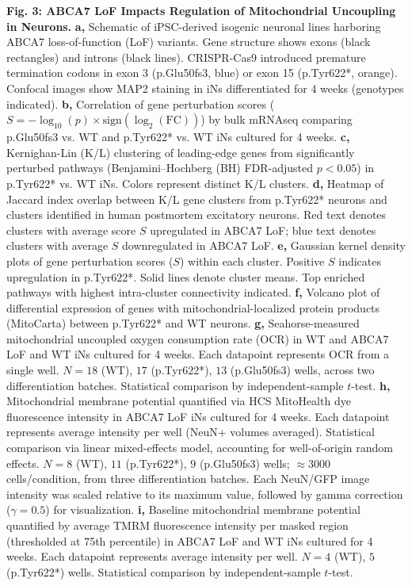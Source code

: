 \textbf{Fig. 3: ABCA7 LoF Impacts Regulation of Mitochondrial Uncoupling in Neurons.}\newline
\textbf{a,} Schematic of iPSC-derived isogenic neuronal lines harboring ABCA7 loss-of-function (LoF) variants. Gene structure shows exons (black rectangles) and introns (black lines). CRISPR-Cas9 introduced premature termination codons in exon 3 (p.Glu50fs3, blue) or exon 15 (p.Tyr622*, orange). Confocal images show MAP2 staining in iNs differentiated for 4 weeks (genotypes indicated).
\textbf{b,} Correlation of gene perturbation scores ($S = -\log_{10}(p)\times\text{sign}(\log_2(\text{FC}))$) by bulk mRNAseq comparing p.Glu50fs3 vs. WT and p.Tyr622* vs. WT iNs cultured for 4 weeks.
\textbf{c,} Kernighan-Lin (K/L) clustering of leading-edge genes from significantly perturbed pathways (Benjamini–Hochberg (BH) FDR-adjusted $p<0.05$) in p.Tyr622* vs. WT iNs. Colors represent distinct K/L clusters.
\textbf{d,} Heatmap of Jaccard index overlap between K/L gene clusters from p.Tyr622* neurons and clusters identified in human postmortem excitatory neurons. Red text denotes clusters with average score $S$ upregulated in ABCA7 LoF; blue text denotes clusters with average $S$ downregulated in ABCA7 LoF.
\textbf{e,} Gaussian kernel density plots of gene perturbation scores ($S$) within each cluster. Positive $S$ indicates upregulation in p.Tyr622*. Solid lines denote cluster means. Top enriched pathways with highest intra-cluster connectivity indicated.
\textbf{f,} Volcano plot of differential expression of genes with mitochondrial-localized protein products (MitoCarta) between p.Tyr622* and WT neurons.
\textbf{g,} Seahorse-measured mitochondrial uncoupled oxygen consumption rate (OCR) in WT and ABCA7 LoF and WT iNs cultured for 4 weeks. Each datapoint represents OCR from a single well. $N=18$ (WT), $17$ (p.Tyr622*), $13$ (p.Glu50fs3) wells, across two differentiation batches. Statistical comparison by independent-sample $t$-test.
\textbf{h,} Mitochondrial membrane potential quantified via HCS MitoHealth dye fluorescence intensity in ABCA7 LoF iNs cultured for 4 weeks. Each datapoint represents average intensity per well (NeuN+ volumes averaged). Statistical comparison via linear mixed-effects model, accounting for well-of-origin random effects. $N=8$ (WT), $11$ (p.Tyr622*), $9$ (p.Glu50fs3) wells; $\approx3000$ cells/condition, from three differentiation batches. Each NeuN/GFP image intensity was scaled relative to its maximum value, followed by gamma correction ($\gamma = 0.5$) for visualization.
\textbf{i,} Baseline mitochondrial membrane potential quantified by average TMRM fluorescence intensity per masked region (thresholded at 75th percentile) in ABCA7 LoF and WT iNs cultured for 4 weeks. Each datapoint represents average intensity per well. $N=4$ (WT), $5$ (p.Tyr622*) wells. Statistical comparison by independent-sample $t$-test.
